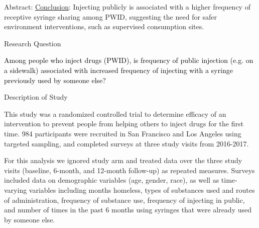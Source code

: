 \documentclass[ignorenonframetext,]{beamer}
\begin{document}
\begin{frame}{}
\begin{block}{Abstract:}
\underline{Conclusion}: Injecting publicly is associated with a higher
frequency of receptive syringe sharing among PWID, suggesting the need
for safer environment interventions, such as supervised consumption
sites.

\normalsize

\end{block}

\end{frame}

\begin{frame}{}

  Research
Question

\vspace{12pt}

\textcolor{black}{Among people who inject drugs (PWID), is frequency of public injection (e.g. on a sidewalk) associated with increased frequency of injecting with a syringe previously used by someone else?}

\end{frame}

\begin{frame}{Description of Study}

This study was a randomized controlled trial to determine efficacy of an
intervention to prevent people from helping others to inject drugs for
the first time. 984 participants were recruited in San Francisco and Los
Angeles using targeted sampling, and completed surveys at three study
visits from 2016-2017.

For this analysis we ignored study arm and treated data over the three
study visits (baseline, 6-month, and 12-month follow-up) as repeated
measures. Surveys included data on demographic variables (age, gender,
race), as well as time-varying variables including months homeless,
types of substances used and routes of administration, frequency of
substance use, frequency of injecting in public, and number of times in
the past 6 months using syringes that were already used by someone else.

\end{frame}
\end{document}
